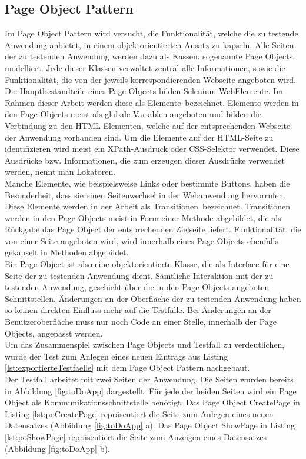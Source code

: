 \subsection{Page Object Pattern}
\label{sec:page_object_pattern}
Im Page Object Pattern wird versucht, die Funktionalität, welche die zu testende Anwendung anbietet, in einem objektorientierten Ansatz zu kapseln.
Alle Seiten der zu testenden Anwendung werden dazu als Kassen, sogenannte Page Objects, modelliert. Jede dieser Klassen verwaltet zentral alle Informationen, sowie die Funktionalität, die von der jeweils korrespondierenden Webseite angeboten wird. Die Hauptbestandteile eines Page Objects bilden Selenium-WebElemente. Im Rahmen dieser Arbeit werden diese als \grq Elemente\grq\ bezeichnet. Elemente werden in den Page Objects meist als globale Variablen angeboten und bilden die Verbindung zu den HTML-Elementen, welche auf der entsprechenden Webseite der Anwendung vorhanden sind.
Um die Elemente auf der HTML-Seite zu identifizieren wird meist ein XPath-Ausdruck oder CSS-Selektor verwendet. Diese Ausdrücke bzw. Informationen, die zum erzeugen dieser Ausdrücke verwendet werden, nennt man \grq Lokatoren\grq.\\ 
Manche Elemente, wie beispielsweise Links oder bestimmte Buttons, haben die Besonderheit, dass sie einen Seitenwechsel in der Webanwendung hervorrufen. Diese Elemente werden in der Arbeit als \grq Transitionen\grq\ bezeichnet. Transitionen werden in den Page Objects meist in Form einer Methode abgebildet, die als Rückgabe das Page Object der entsprechenden Zielseite liefert. Funktionalität, die von einer Seite angeboten wird, wird innerhalb eines Page Objects ebenfalls gekapselt in Methoden abgebildet.\\
Ein Page Object ist also eine objektorientierte Klasse, die als Interface für eine Seite der zu testenden Anwendung dient.
Sämtliche Interaktion mit der zu testenden Anwendung, geschieht über die in den Page Objects angeboten Schnittstellen.
Änderungen an der Oberfläche der zu testenden Anwendung haben so keinen direkten Einfluss mehr auf die Testfälle. Bei Änderungen an der Benutzeroberfläche muss nur noch Code an einer Stelle, innerhalb der Page Objects, angepasst werden.\\
Um das Zusammenspiel zwischen Page Objects und Testfall zu verdeutlichen, wurde der Test zum Anlegen eines neuen Eintrags aus Listing \ref{lst:exportierteTestfaelle} mit dem Page Object Pattern nachgebaut.\\
Der Testfall arbeitet mit zwei Seiten der Anwendung. Die Seiten wurden bereits in Abbildung \ref{fig:toDoApp} dargestellt. Für jede der beiden Seiten wird ein Page Object als Kommunikationsschnittstelle benötigt. 
Das Page Object CreatePage in Listing \ref{lst:poCreatePage} repräsentiert die Seite zum Anlegen eines neuen Datensatzes (Abbildung \ref{fig:toDoApp} a). Das Page Object ShowPage in Listing \ref{lst:poShowPage} repräsentiert die Seite zum Anzeigen eines Datensatzes (Abbildung \ref{fig:toDoApp} b).

